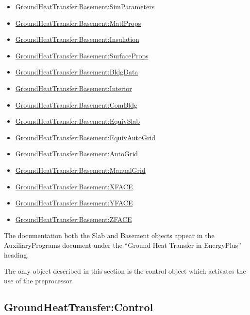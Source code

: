 \begin{itemize}
\tightlist
\item
  \hyperref[group-detailed-ground-heat-transfer]{GroundHeatTransfer:Basement:SimParameters}
\item
  \hyperref[group-detailed-ground-heat-transfer]{GroundHeatTransfer:Basement:MatlProps}
\item
  \hyperref[group-detailed-ground-heat-transfer]{GroundHeatTransfer:Basement:Insulation}
\item
  \hyperref[group-detailed-ground-heat-transfer]{GroundHeatTransfer:Basement:SurfaceProps}
\item
  \hyperref[group-detailed-ground-heat-transfer]{GroundHeatTransfer:Basement:BldgData}
\item
  \hyperref[group-detailed-ground-heat-transfer]{GroundHeatTransfer:Basement:Interior}
\item
  \hyperref[group-detailed-ground-heat-transfer]{GroundHeatTransfer:Basement:ComBldg}
\item
  \hyperref[group-detailed-ground-heat-transfer]{GroundHeatTransfer:Basement:EquivSlab}
\item
  \hyperref[group-detailed-ground-heat-transfer]{GroundHeatTransfer:Basement:EquivAutoGrid}
\item
  \hyperref[group-detailed-ground-heat-transfer]{GroundHeatTransfer:Basement:AutoGrid}
\item
  \hyperref[group-detailed-ground-heat-transfer]{GroundHeatTransfer:Basement:ManualGrid}
\item
  \hyperref[group-detailed-ground-heat-transfer]{GroundHeatTransfer:Basement:XFACE}
\item
  \hyperref[group-detailed-ground-heat-transfer]{GroundHeatTransfer:Basement:YFACE}
\item
  \hyperref[group-detailed-ground-heat-transfer]{GroundHeatTransfer:Basement:ZFACE}
\end{itemize}

The documentation both the Slab and Basement objects appear in the AuxiliaryPrograms document under the ``Ground Heat Transfer in EnergyPlus'' heading.

The only object described in this section is the control object which activates the use of the preprocessor.

\subsection{GroundHeatTransfer:Control}\label{groundheattransfercontrol}

